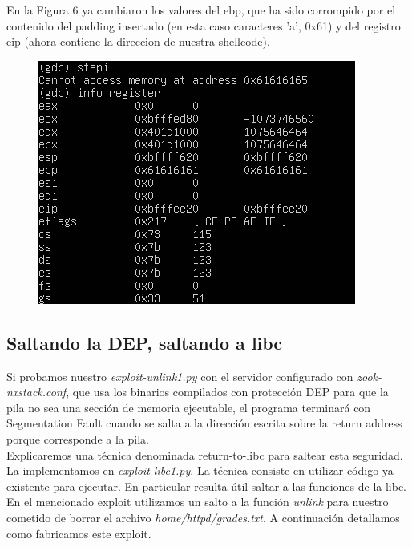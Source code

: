 \documentclass[12pt]{article}
\begin{document}
En la Figura 6 ya cambiaron los valores del ebp, que ha sido corrompido por el contenido del padding insertado (en esta caso caracteres 'a', 0x61) y del registro eip (ahora contiene la direccion de nuestra shellcode).

\begin{figure}[htp]
\centering
\includegraphics[scale=0.8]{./imagenes/ex2.png}
\caption{}
\end{figure}


\subsection{Saltando la DEP, saltando a libc }
Si probamos nuestro \textit{exploit-unlink1.py} con el servidor configurado con \textit{zook-nxstack.conf}, que usa los binarios compilados con protección DEP para que la pila no sea una sección de memoria ejecutable, el programa terminará con Segmentation Fault cuando se salta a la dirección escrita sobre la return address porque corresponde a la pila. \\

Explicaremos una técnica denominada return-to-libc para saltear esta seguridad. La implementamos en \textit{exploit-libc1.py}. La técnica consiste en utilizar código ya existente para ejecutar. En particular resulta útil saltar a las funciones de la libc. En el mencionado exploit utilizamos un salto a la función \textit{unlink} para nuestro cometido de borrar el archivo \textit{home/httpd/grades.txt}. A continuación detallamos como fabricamos este exploit. \\
\end{document}
